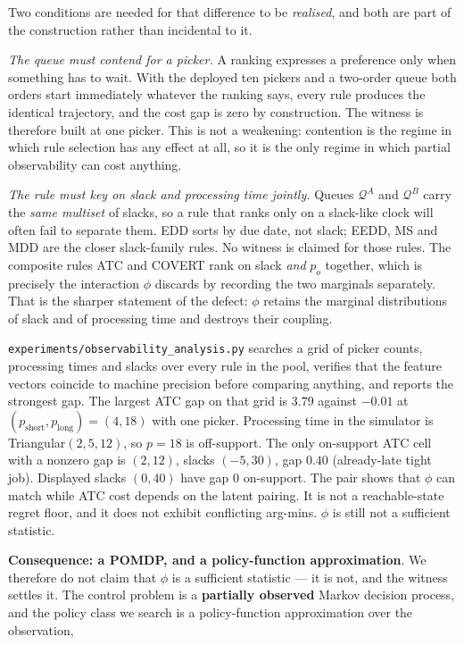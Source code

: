 \documentclass[review,3p,times]{elsarticle}
\theoremstyle{definition}
\begin{document}
Two conditions are needed for that difference to be \emph{realised}, and
both are part of the construction rather than incidental to it.

\emph{The queue must contend for a picker.} A ranking expresses a
preference only when something has to wait. With the deployed ten
pickers and a two-order queue both orders start immediately whatever the
ranking says, every rule produces the identical trajectory, and the cost
gap is zero by construction. The witness is therefore built at one
picker. This is not a weakening: contention is the regime in which rule
selection has any effect at all, so it is the only regime in which
partial observability can cost anything.

\emph{The rule must key on slack and processing time jointly.} Queues
\(\mathcal{Q}^A\) and \(\mathcal{Q}^B\) carry the \emph{same multiset}
of slacks, so a rule that ranks only on a slack-like clock will often
fail to separate them. EDD sorts by due date, not slack; EEDD, MS and
MDD are the closer slack-family rules. No witness is claimed for those
rules. The composite rules ATC and COVERT rank on slack \emph{and}
\(p_o\) together, which is precisely the interaction \(\phi\) discards
by recording the two marginals separately. That is the sharper statement
of the defect: \(\phi\) retains the marginal distributions of slack and
of processing time and destroys their coupling.

\texttt{experiments/observability\_analysis.py} searches a grid of
picker counts, processing times and slacks over every rule in the pool,
verifies that the feature vectors coincide to machine precision before
comparing anything, and reports the strongest gap. The largest ATC gap
on that grid is \(3.79\) against \(-0.01\) at
\((p_{\mathrm{short}}, p_{\mathrm{long}}) = (4, 18)\) with one picker.
Processing time in the simulator is Triangular\((2,5,12)\), so \(p=18\)
is off-support. The only on-support ATC cell with a nonzero gap is
\((2,12)\), slacks \((-5,30)\), gap \(0.40\) (already-late tight job).
Displayed slacks \((0,40)\) have gap \(0\) on-support. The pair shows
that \(\phi\) can match while ATC cost depends on the latent pairing. It
is not a reachable-state regret floor, and it does not exhibit
conflicting arg-mins. \(\phi\) is still not a sufficient statistic.

\textbf{Consequence: a POMDP, and a policy-function approximation}. We
therefore do not claim that \(\phi\) is a sufficient statistic --- it is
not, and the witness settles it. The control problem is a
\textbf{partially observed} Markov decision process, and the policy
class we search is a policy-function approximation over the observation,
\end{document}
